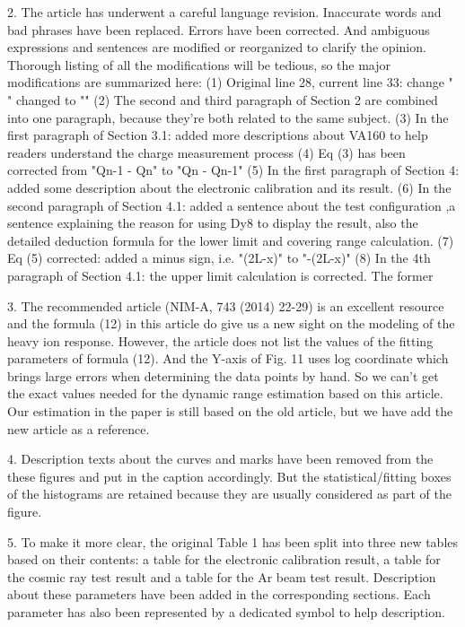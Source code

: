 \documentclass[]{article}
\begin{document}
2. The article has underwent a careful language revision. Inaccurate words and bad phrases have been replaced.  Errors have been corrected. And ambiguous expressions and sentences are modified or reorganized to clarify the opinion. Thorough listing of all the modifications will be tedious, so the major modifications are summarized here:
     (1) Original line 28, current line 33: change "  " changed to "\beta{}"
     (2) The second and third paragraph of Section 2 are combined into one paragraph, because they're both related to the same subject.
     (3) In the first paragraph of Section 3.1: added more descriptions about VA160 to help readers understand the charge measurement process
     (4) Eq (3) has been corrected from "Qn-1 - Qn" to "Qn - Qn-1"
     (5) In the first paragraph of Section 4: added some description about the electronic calibration and its result.
     (6) In the second paragraph of Section 4.1: added a sentence about the test configuration ,a sentence explaining the reason for using Dy8 to display the result, also the detailed deduction formula for the lower limit and covering range calculation.
     (7) Eq (5) corrected: added a minus sign, i.e. "(2L-x)" to "-(2L-x)"
     (8) In the 4th paragraph of Section 4.1: the upper limit calculation is corrected. The former 

3. The recommended article (NIM-A, 743 (2014) 22-29) is an excellent resource and the formula (12) in this article do give us a new sight on the modeling of the heavy ion response. However, the article does not list the values of the fitting parameters of formula (12). And the Y-axis of Fig. 11 uses log coordinate which brings large errors when determining the data points by hand. So we can't get the exact values needed for the dynamic range estimation based on this article. Our estimation in the paper is still based on the old article, but we have add the new article as a reference.

4. Description texts about the curves and marks have been removed from the these figures and put in the caption accordingly. But the statistical/fitting boxes of the histograms are retained because they are usually considered as part of the figure.

5. To make it more clear, the original Table 1 has been split into three new tables based on their contents: a table for the electronic  calibration result, a table for the cosmic ray test result and a table for the Ar beam test result. Description about these parameters have been added in the corresponding sections. Each parameter has also been represented by a dedicated symbol to help description.
\end{document}

